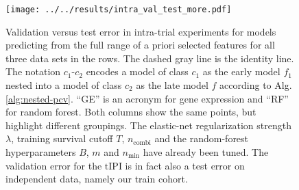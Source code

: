 \begin{figure}
    \centering
    \texttt{[image: ../../results/intra\_val\_test\_more.pdf]}
    \caption{Validation versus test error in intra-trial experiments for models predicting from the 
        full range of a priori selected features for all three data sets in the rows. The dashed 
        gray line is the identity line. The notation 
        $c_1$-$c_2$ encodes a model of class $c_1$ as the early model $f_1$ nested into a model of 
        class $c_2$ as the late model $f$ according to Alg. \ref{alg:nested-pcv}.
        ``GE'' is an acronym for gene expression and ``RF'' for random forest. Both columns show 
        the same points, but highlight different groupings. The elastic-net 
        regularization strength $\lambda$, training survival cutoff $T$, $n_\text{combi}$ and the 
        random-forest hyperparameters $B$, $m$ and $n_\text{min}$ have already been tuned. The 
        validation error for the $\text{tIPI}$ is in fact also a test error on independent data, 
        namely our train cohort.}
    \label{fig:intra-val-test-more}
\end{figure}